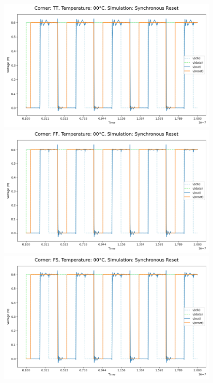 \begin{figure}[H]
    \centering
    \includegraphics[height= 0.21\textheight]{figures/aimspice/0.600_0.1u_0.1u_0.3u_0.1u/functionality/TT00W3.png}
    \vspace{5pt}
    \includegraphics[height= 0.21\textheight]{figures/aimspice/0.600_0.1u_0.1u_0.3u_0.1u/functionality/FF00W3.png}
    \vspace{5pt}
    \includegraphics[height= 0.21\textheight]{figures/aimspice/0.600_0.1u_0.1u_0.3u_0.1u/functionality/FS00W3.png}

\end{figure}
